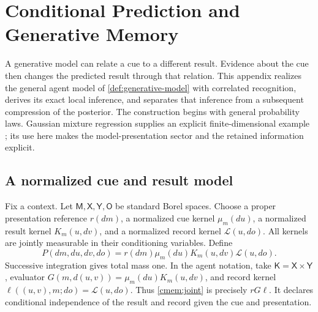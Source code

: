 \chapter{Conditional Prediction and Generative Memory}
\label{app:conditional-memory}

A generative model can relate a cue to a different result. Evidence about the cue then changes the predicted result through that relation. This appendix realizes the general agent model of \cref{def:generative-model} with correlated recognition, derives its exact local inference, and separates that inference from a subsequent compression of the posterior. The construction begins with general probability laws. Gaussian mixture regression supplies an explicit finite-dimensional example \citep{Calinon2016}; its use here makes the model-presentation sector and the retained information explicit.

\section{A normalized cue and result model}

Fix a context. Let $\mathsf M,\mathsf X,\mathsf Y,\mathsf O$ be standard Borel spaces. Choose a proper presentation reference $r(dm)$, a normalized cue kernel $\mu_m(du)$, a normalized result kernel $K_m(u,dv)$, and a normalized record kernel $\mathcal L(u,do)$. All kernels are jointly measurable in their conditioning variables. Define
\begin{equation}
 P(dm,du,dv,do)=r(dm)\mu_m(du)K_m(u,dv)\mathcal L(u,do).
 \label{cmem:joint}
\end{equation}
Successive integration gives total mass one. In the agent notation, take $\mathsf K=\mathsf X\times\mathsf Y$, evaluator $G(m,d(u,v))=\mu_m(du)K_m(u,dv)$, and record kernel $\ell((u,v),m;do)=\mathcal L(u,do)$. Thus \cref{cmem:joint} is precisely $rG\ell$. It declares conditional independence of the result and record given the cue and presentation.

